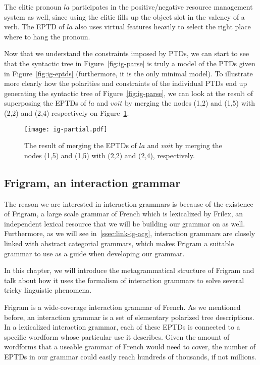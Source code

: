 The clitic pronoun $la$ participates in the positive/negative resource
management system as well, since using the clitic fills up the object
slot in the valency of a verb. The EPTD of $la$ also uses virtual
features heavily to select the right place where to hang the pronoun.

Now that we understand the constraints imposed by PTDs, we can start to
see that the syntactic tree in Figure~\ref{fig:ig-parse} is truly a
model of the PTDs given in Figure~\ref{fig:ig-eptds} (furthermore, it is
the only minimal model). To illustrate more clearly how the polarities
and constraints of the individual PTDs end up generating the syntactic
tree of Figure~\ref{fig:ig-parse}, we can look at the result of
superposing the EPTDs of $la$ and $voit$ by merging the nodes (1,2) and
(1,5) with (2,2) and (2,4) respectively on Figure~\ref{fig:ig-partial}.

\begin{figure}
  \centering
  \texttt{[image: ig-partial.pdf]}
  \caption{\label{fig:ig-partial} The result of merging the EPTDs of
    $la$ and $voit$ by merging the nodes (1,5) and (1,5) with (2,2) and
    (2,4), respectively.}
\end{figure}

\subsection{Frigram, an interaction grammar}
\label{ssec:frigram}

The reason we are interested in interaction grammars is because of the
existence of Frigram, a large scale grammar of French which is
lexicalized by Frilex, an independent lexical resource that we will be
building our grammar on as well. Furthermore, as we will see
in~\ref{ssec:link-ig-acg}, interaction grammars are closely linked with
abstract categorial grammars, which makes Frigram a suitable grammar to
use as a guide when developing our grammar.

In this chapter, we will introduce the metagrammatical structure of
Frigram and talk about how it uses the formalism of interaction grammars
to solve several tricky linguistic phenomena.


Frigram is a wide-coverage interaction grammar of French. As we
mentioned before, an interaction grammar is a set of elementary
polarized tree descriptions. In a lexicalized interaction grammar, each
of these EPTDs is connected to a specific wordform whose particular use
it describes. Given the amount of wordforms that a useable grammar of
French would need to cover, the number of EPTDs in our grammar could
easily reach hundreds of thousands, if not millions.

